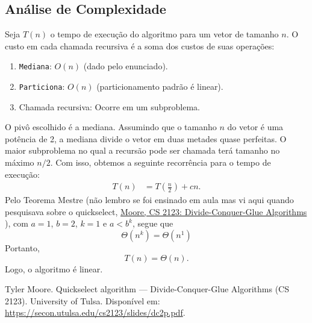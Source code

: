 \documentclass[a4paper,12pt]{article}
\begin{document}
\subsection*{Análise de Complexidade}
Seja $T(n)$ o tempo de execução do algoritmo para um vetor de tamanho $n$. O custo em cada chamada recursiva é a soma dos custos de suas operações:
\begin{enumerate}
    \item \texttt{Mediana}: $O(n)$ (dado pelo enunciado).
    \item \texttt{Particiona}: $O(n)$ (particionamento padrão é linear).
    \item Chamada recursiva: Ocorre em um subproblema.
\end{enumerate}
O pivô escolhido é a mediana. Assumindo que o tamanho $n$ do vetor é uma potência de 2, a mediana divide o vetor em duas metades quase perfeitas. O maior subproblema no qual a recursão pode ser chamada terá tamanho no máximo $n/2$.
Com isso, obtemos a seguinte recorrência para o tempo de execução:
\begin{align*}
T(n) &= T\!\left(\frac{n}{2}\right) + cn.
\end{align*}
Pelo Teorema Mestre (não lembro se foi ensinado em aula mas vi aqui quando pesquisava sobre o quickselect, \href{https://secon.utulsa.edu/cs2123/slides/dc2p.pdf}{Moore, CS 2123: Divide-Conquer-Glue Algorithms} \cite{moore_dc2p}), com $a=1$, $b=2$, $k=1$ e $a < b^k$, segue que
\begin{equation}
    \Theta(n^k) = \Theta(n^1)
\end{equation}
Portanto, 
\begin{equation}
    \boxed{T(n) = \Theta(n)}.
\end{equation}
Logo, o algoritmo é linear.

\begin{thebibliography}{1}
 Tyler Moore. Quickselect algorithm — Divide-Conquer-Glue Algorithms (CS 2123). University of Tulsa. Disponível em: \href{https://secon.utulsa.edu/cs2123/slides/dc2p.pdf}{https://secon.utulsa.edu/cs2123/slides/dc2p.pdf}.
\end{thebibliography}
\end{document}
